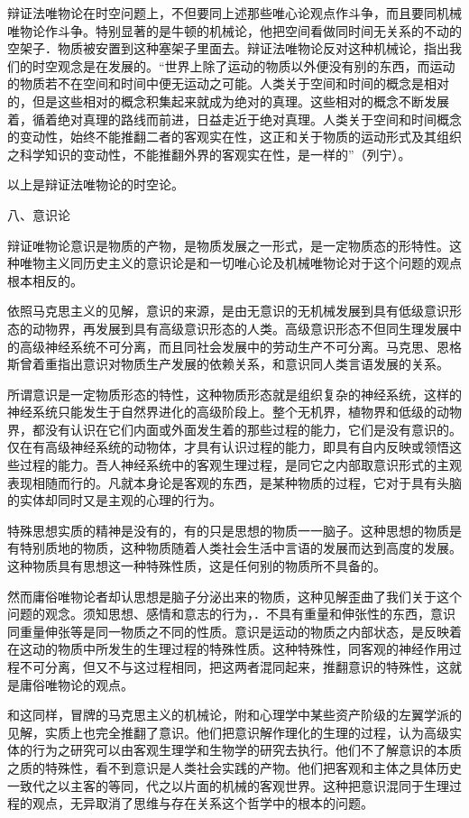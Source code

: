 辩证法唯物论在时空问题上，不但要同上述那些唯心论观点作斗争，而且要同机械唯物论作斗争。特别显著的是牛顿的机械论，他把空间看做同时间无关系的不动的空架子．物质被安置到这种塞架子里面去。辩证法唯物论反对这种机械论，指出我们的时空观念是在发展的。“世界上除了运动的物质以外便没有别的东西，而运动的物质若不在空间和时间中便无运动之可能。人类关于空间和时间的概念是相对的，但是这些相对的概念积集起来就成为绝对的真理。这些相对的概念不断发展着，循着绝对真理的路线而前进，日益走近于绝对真理。人类关于空间和时间概念的变动性，始终不能推翻二者的客观实在性，这正和关于物质的运动形式及其组织之科学知识的变动性，不能推翻外界的客观实在性，是一样的”（列宁）。

以上是辩证法唯物论的时空论。

八、意识论

辩证唯物论意识是物质的产物，是物质发展之一形式，是一定物质态的形特性。这种唯物主义同历史主义的意识论是和一切唯心论及机械唯物论对于这个问题的观点根本相反的。

依照马克思主义的见解，意识的来源，是由无意识的无机械发展到具有低级意识形态的动物界，再发展到具有高级意识形态的人类。高级意识形态不但同生理发展中的高级神经系统不可分离，而且同社会发展中的劳动生产不可分离。马克思、恩格斯曾着重指出意识对物质生产发展的依赖关系，和意识同人类言语发展的关系。

所谓意识是一定物质形态的特性，这种物质形态就是组织复杂的神经系统，这样的神经系统只能发生于自然界进化的高级阶段上。整个无机界，植物界和低级的动物界，都没有认识在它们内面或外面发生着的那些过程的能力，它们是没有意识的。仅在有高级神经系统的动物体，才具有认识过程的能力，即具有自内反映或领悟这些过程的能力。吾人神经系统中的客观生理过程，是同它之内部取意识形式的主观表现相随而行的。凡就本身论是客观的东西，是某种物质的过程，它对于具有头脑的实体却同时又是主观的心理的行为。

特殊思想实质的精神是没有的，有的只是思想的物质一一脑子。这种思想的物质是有特别质地的物质，这种物质随着人类社会生活中言语的发展而达到高度的发展。这种物质具有思想这一种特殊性质，这是任何别的物质所不具备的。

然而庸俗唯物论者却认思想是脑子分泌出来的物质，这种见解歪曲了我们关于这个问题的观念。须知思想、感情和意志的行为，．不具有重量和伸张性的东西，意识同重量伸张等是同一物质之不同的性质。意识是运动的物质之内部状态，是反映着在这动的物质中所发生的生理过程的特殊性质。这种特殊性，同客观的神经作用过程不可分离，但又不与这过程相同，把这两者混同起来，推翻意识的特殊性，这就是庸俗唯物论的观点。

和这同样，冒牌的马克思主义的机械论，附和心理学中某些资产阶级的左翼学派的见解，实质上也完全推翻了意识。他们把意识解作理化的生理的过程，认为高级实体的行为之研究可以由客观生理学和生物学的研究去执行。他们不了解意识的本质之质的特殊性，看不到意识是人类社会实践的产物。他们把客观和主体之具体历史一致代之以主客的等同，代之以片面的机械的客观世界。这种把意识混同于生理过程的观点，无异取消了思维与存在关系这个哲学中的根本的问题。

